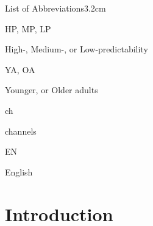 \documentclass[a4paper, nobind]{templates/ociamthesis}
\begin{document}
\begin{romanpages}

\flushbottom

\tableofcontents

\listoffigures
	\mtcaddchapter

\listoftables
  \mtcaddchapter
\begin{mclistof}{List of Abbreviations}{3.2cm}

\item[HP, MP, LP]

High-, Medium-, or Low-predictability

\item[YA, OA]

Younger, or Older adults

\item[ch]

channels

\item[EN]

English

\end{mclistof} 


\end{romanpages}

\flushbottom

\hypertarget{introduction}{%
\chapter{Introduction}\label{introduction}}
\end{document}
